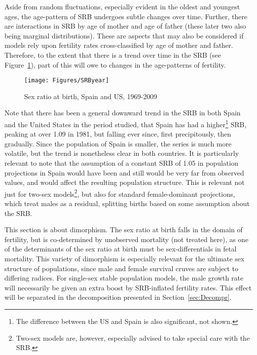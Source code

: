 Aside from random fluctuations, especially evident in the oldest and youngest
ages, the age-pattern of SRB undergoes subtle changes over time. Further, there
are interactions in SRB by age of mother and age of father (these later two
also being marginal distributions). These are aspects that may also be
considered if models rely upon fertility rates cross-classified by age of mother
and father. Therefore, to the extent that there is a trend over time in the SRB
(see Figure~\ref{fig:SRByears}), part of this will owe to changes in the
age-patterns of fertility.

\begin{figure}[ht!]
        \centering  
          \caption{Sex ratio at birth, Spain
          and US, 1969-2009}
           \texttt{[image: Figures/SRByear]}
          \label{fig:SRByears}
\end{figure}

Note that there has been a general downward trend in the SRB in both Spain and
the United States in the period studied, that Spain has had a
higher\footnote{The difference between the US and Spain is also significant, not
shown.} SRB, peaking at over 1.09 in 1981, but falling ever since, first
precipitously, then gradually. Since the population of Spain is smaller, the 
series is much more volatile, but the trend is nonetheless clear 
in both countries. It is particularly relevant to note that
the assumption of a constant SRB of 1.05 in population projections in Spain
would have been and still would be very far from observed values, and would 
affect the resulting population structure. This is relevant not
just for two-sex models\footnote{Two-sex models are, however, especially advised
to take special care with the SRB.}, but also for standard female-dominant
projections, which treat males as a residual, splitting births based on some
assumption about the SRB.

This section is about dimorphism. The sex ratio at birth
falls in the domain of fertility, but is co-determined by unobserved mortality
(not treated here), as one of the determinants of the sex ratio at birth must be
sex-differentials in fetal mortality. This variety of dimorphism is especially relevant for the ultimate
sex structure of populations, since male and female survival cruves are subject 
to differing radices. For single-sex stable population models, the male growth
rate will necessarily be given an extra boost by SRB-inflated fertility
rates. This effect will be separated in the decomposition presented in
Section~\ref{sec:Decompr}.
